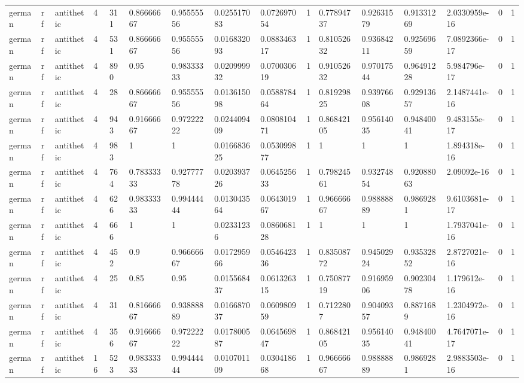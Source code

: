 \begin{tabular}{llllllllllllllll}
german & rf & antithetic & 4 & 311 & 0.86666667 & 0.95555556 & 0.025517083 & 0.072697054 & 1 & 0.77894737 & 0.92631579 & 0.91331269 & 2.0330959e-16 & 0 & 1 \\
german & rf & antithetic & 4 & 531 & 0.86666667 & 0.95555556 & 0.016832093 & 0.088346317 & 1 & 0.81052632 & 0.93684211 & 0.92569659 & 7.0892366e-17 & 0 & 1 \\
german & rf & antithetic & 4 & 890 & 0.95 & 0.98333333 & 0.020999932 & 0.070030619 & 1 & 0.91052632 & 0.97017544 & 0.96491228 & 5.984796e-17 & 0 & 1 \\
german & rf & antithetic & 4 & 28 & 0.86666667 & 0.95555556 & 0.013615098 & 0.058878464 & 1 & 0.81929825 & 0.93976608 & 0.92913657 & 2.1487441e-16 & 0 & 1 \\
german & rf & antithetic & 4 & 943 & 0.91666667 & 0.97222222 & 0.024409409 & 0.080810471 & 1 & 0.86842105 & 0.95614035 & 0.94840041 & 9.483155e-17 & 0 & 1 \\
german & rf & antithetic & 4 & 983 & 1 & 1 & 0.016683625 & 0.053099877 & 1 & 1 & 1 & 1 & 1.894318e-16 & 0 & 1 \\
german & rf & antithetic & 4 & 764 & 0.78333333 & 0.92777778 & 0.020393726 & 0.064525633 & 1 & 0.79824561 & 0.93274854 & 0.92088063 & 2.09092e-16 & 0 & 1 \\
german & rf & antithetic & 4 & 626 & 0.98333333 & 0.99444444 & 0.013043564 & 0.064301967 & 1 & 0.96666667 & 0.98888889 & 0.9869281 & 9.6103681e-17 & 0 & 1 \\
german & rf & antithetic & 4 & 666 & 1 & 1 & 0.02331236 & 0.086068128 & 1 & 1 & 1 & 1 & 1.7937041e-16 & 0 & 1 \\
german & rf & antithetic & 4 & 452 & 0.9 & 0.96666667 & 0.017295966 & 0.054642336 & 1 & 0.83508772 & 0.94502924 & 0.93532852 & 2.8727021e-16 & 0 & 1 \\
german & rf & antithetic & 4 & 25 & 0.85 & 0.95 & 0.015568437 & 0.061326315 & 1 & 0.75087719 & 0.91695906 & 0.90230478 & 1.179612e-16 & 0 & 1 \\
german & rf & antithetic & 4 & 31 & 0.81666667 & 0.93888889 & 0.016687037 & 0.060980959 & 1 & 0.7122807 & 0.90409357 & 0.8871689 & 1.2304972e-16 & 0 & 1 \\
german & rf & antithetic & 4 & 356 & 0.91666667 & 0.97222222 & 0.017800587 & 0.064569847 & 1 & 0.86842105 & 0.95614035 & 0.94840041 & 4.7647071e-17 & 0 & 1 \\
german & rf & antithetic & 16 & 523 & 0.98333333 & 0.99444444 & 0.010701109 & 0.030418668 & 1 & 0.96666667 & 0.98888889 & 0.9869281 & 2.9883503e-16 & 0 & 1 \\

\end{tabular}
